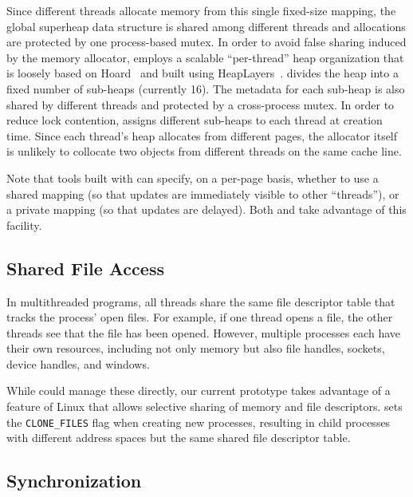 Since different threads allocate memory from this single fixed-size
mapping, the global superheap data structure is shared among different
threads and allocations are protected by one process-based mutex.  In
order to avoid false sharing induced by the memory allocator,
\sheriff{} employs a scalable ``per-thread'' heap organization that is
loosely based on Hoard~\cite{BergerMcKinleyBlumofeWilson:ASPLOS2000}
and built using HeapLayers~\cite{BergerZornMcKinley:2001}.  \sheriff{}
divides the heap into a fixed number of sub-heaps (currently 16).  The
metadata for each sub-heap is also shared by different threads and
protected by a cross-process mutex.  In order to reduce lock
contention, \sheriff{} assigns different sub-heaps to each thread at
creation time. Since each thread's heap allocates from different pages, 
the allocator itself is unlikely to collocate two objects from different 
threads on the same cache line.

Note that tools built with \sheriff{} can specify, on a per-page basis,
whether to use a shared mapping (so that updates are immediately
visible to other ``threads''), or a private mapping (so that updates
are delayed). Both \sheriffdetect{} and \sheriffprotect{} take
advantage of this facility.

\subsection{Shared File Access}
\label{sec:fileshare}

In multithreaded programs, all threads share the same file descriptor table
that tracks the process' open files.  For example, if one thread opens a 
file, the other threads see that the file has been opened.  However, 
multiple processes each have their own resources, including not only 
memory but also file handles, sockets, device handles, and windows.

While \sheriff{} could manage these directly, our current prototype
takes advantage of a feature of Linux that allows selective sharing of
memory and file descriptors. \sheriff{} sets the \texttt{CLONE\_FILES}
flag when creating new processes, resulting in child processes with
different address spaces but the same shared file descriptor table.

\subsection{Synchronization}
\label{simulation:syn}

